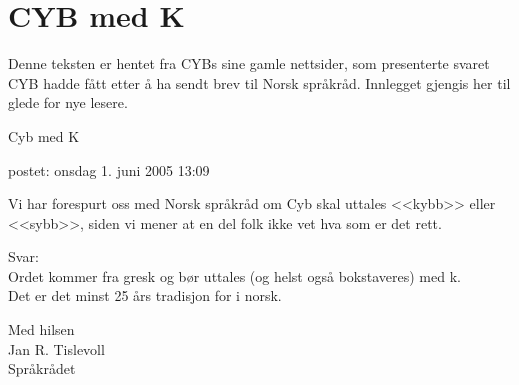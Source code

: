 \chapter{CYB med K}

Denne teksten er hentet fra CYBs sine gamle nettsider, som presenterte svaret CYB hadde fått etter å ha sendt brev til Norsk språkråd. Innlegget gjengis her til glede for nye lesere.

\begin{displayquote}
	Cyb med K

	postet: onsdag 1. juni 2005 13:09

	Vi har forespurt oss med Norsk språkråd om Cyb skal uttales <<kybb>> eller <<sybb>>, siden vi mener at en del folk ikke vet hva som er det rett.

	Svar: \\
	Ordet kommer fra gresk og bør uttales (og helst også bokstaveres) med k. \\
	Det er det minst 25 års tradisjon for i norsk.

	Med hilsen \\
	Jan R. Tislevoll \\
	Språkrådet
\end{displayquote}
